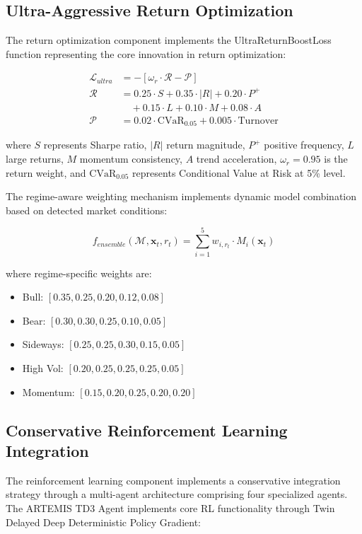 \documentclass[10pt,twocolumn]{article}
\begin{document}
\subsection{Ultra-Aggressive Return Optimization}

The return optimization component implements the UltraReturnBoostLoss function representing the core innovation in return optimization:

\begin{align}
\mathcal{L}_{ultra} &= -[\omega_r \cdot \mathcal{R} - \mathcal{P}] \\
\mathcal{R} &= 0.25 \cdot S + 0.35 \cdot |R| + 0.20 \cdot P^+ \\
&\quad + 0.15 \cdot L + 0.10 \cdot M + 0.08 \cdot A \\
\mathcal{P} &= 0.02 \cdot \text{CVaR}_{0.05} + 0.005 \cdot \text{Turnover}
\end{align}

where $S$ represents Sharpe ratio, $|R|$ return magnitude, $P^+$ positive frequency, $L$ large returns, $M$ momentum consistency, $A$ trend acceleration, $\omega_r = 0.95$ is the return weight, and $\text{CVaR}_{0.05}$ represents Conditional Value at Risk at 5\% level.

The regime-aware weighting mechanism implements dynamic model combination based on detected market conditions:

\begin{equation}
f_{ensemble}(\mathcal{M}, \mathbf{x}_t, r_t) = \sum_{i=1}^{5} w_{i,r_t} \cdot M_i(\mathbf{x}_t)
\end{equation}

where regime-specific weights are:
\begin{itemize}[itemsep=0pt]
\item Bull: $[0.35, 0.25, 0.20, 0.12, 0.08]$
\item Bear: $[0.30, 0.30, 0.25, 0.10, 0.05]$
\item Sideways: $[0.25, 0.25, 0.30, 0.15, 0.05]$
\item High Vol: $[0.20, 0.25, 0.25, 0.25, 0.05]$
\item Momentum: $[0.15, 0.20, 0.25, 0.20, 0.20]$
\end{itemize}

\subsection{Conservative Reinforcement Learning Integration}

The reinforcement learning component implements a conservative integration strategy through a multi-agent architecture comprising four specialized agents. The ARTEMIS TD3 Agent implements core RL functionality through Twin Delayed Deep Deterministic Policy Gradient:
\end{document}
